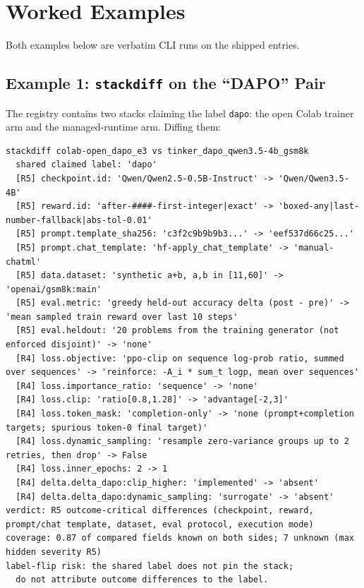 \section{Worked Examples}
\label{sec:p6-worked}
Both examples below are verbatim CLI runs on the shipped entries.

\subsection{Example 1: \texttt{stackdiff} on the ``DAPO'' Pair}
\label{sec:p6-worked-dapo}
The registry contains two stacks claiming the label \texttt{dapo}: the open
Colab trainer arm and the managed-runtime arm. Diffing them:

\begin{lstlisting}[basicstyle=\ttfamily\scriptsize, frame=single,
  breaklines=true, caption={\texttt{stackdiff colab-open_dapo_e3
  tinker_dapo_qwen3.5-4b_gsm8k} (abridged: R3/R2/R1 lines omitted; hashes
  truncated). Regenerate with \texttt{python3 registry/query.py stackdiff}.},
  label={lst:p6-stackdiff}]
stackdiff colab-open_dapo_e3 vs tinker_dapo_qwen3.5-4b_gsm8k
  shared claimed label: 'dapo'
  [R5] checkpoint.id: 'Qwen/Qwen2.5-0.5B-Instruct' -> 'Qwen/Qwen3.5-4B'
  [R5] reward.id: 'after-####-first-integer|exact' -> 'boxed-any|last-number-fallback|abs-tol-0.01'
  [R5] prompt.template_sha256: 'c3f2c9b9b9b3...' -> 'eef537d66c25...'
  [R5] prompt.chat_template: 'hf-apply_chat_template' -> 'manual-chatml'
  [R5] data.dataset: 'synthetic a+b, a,b in [11,60]' -> 'openai/gsm8k:main'
  [R5] eval.metric: 'greedy held-out accuracy delta (post - pre)' -> 'mean sampled train reward over last 10 steps'
  [R5] eval.heldout: '20 problems from the training generator (not enforced disjoint)' -> 'none'
  [R4] loss.objective: 'ppo-clip on sequence log-prob ratio, summed over sequences' -> 'reinforce: -A_i * sum_t logp, mean over sequences'
  [R4] loss.importance_ratio: 'sequence' -> 'none'
  [R4] loss.clip: 'ratio[0.8,1.28]' -> 'advantage[-2,3]'
  [R4] loss.token_mask: 'completion-only' -> 'none (prompt+completion targets; spurious token-0 final target)'
  [R4] loss.dynamic_sampling: 'resample zero-variance groups up to 2 retries, then drop' -> False
  [R4] loss.inner_epochs: 2 -> 1
  [R4] delta.delta_dapo:clip_higher: 'implemented' -> 'absent'
  [R4] delta.delta_dapo:dynamic_sampling: 'surrogate' -> 'absent'
verdict: R5 outcome-critical differences (checkpoint, reward, prompt/chat template, dataset, eval protocol, execution mode)
coverage: 0.87 of compared fields known on both sides; 7 unknown (max hidden severity R5)
label-flip risk: the shared label does not pin the stack;
  do not attribute outcome differences to the label.
\end{lstlisting}

